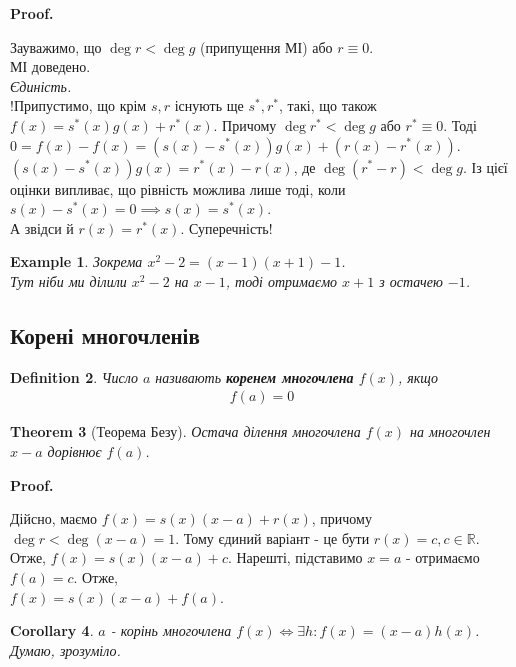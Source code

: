 \documentclass[a4paper, 10pt]{extarticle}
\makeatletter
\def\qed{$\blacksquare$}
\def\qed{$\blacksquare$}
\theoremstyle{theoremdd}
\newtheorem{theorem}{Theorem}[subsection]
\theoremstyle{theoremdd}
\newtheorem{definition}[theorem]{Definition}
\theoremstyle{theoremdd}
\theoremstyle{theoremdd}
\newtheorem{example}[theorem]{Example}
\theoremstyle{theoremdd}
\theoremstyle{theoremdd}
\theoremstyle{theoremdd}
\theoremstyle{theoremdd}
\newtheorem{corollary}[theorem]{Corollary}
\renewenvironment{proof}[1][Proof.\\]{\par
\pushQED{\hfill \qed}%
\normalfont \topsep6\p@\@plus6\p@\relax
\trivlist
\item\relax
{\bfseries
#1\@addpunct{.}}\hspace\labelsep\ignorespaces
}{%
\popQED\endtrivlist\@endpefalse
}
\makeatother
\begin{document}
\begin{proof}
Зауважимо, що $\deg r < \deg g$ (припущення МІ) або $r \equiv 0$.\\
МІ доведено.
\bigskip \\
\textit{Єдиність.}\\
!Припустимо, що крім $s,r$ існують ще $s^*,r^*$, такі, що також $f(x) = s^*(x)g(x) + r^*(x)$. Причому $\deg r^* < \deg g$ або $r^* \equiv 0$. Тоді \\ $0 = f(x) - f(x) = (s(x)-s^*(x))g(x) + (r(x)-r^*(x))$.\\
$(s(x)-s^*(x))g(x) = r^*(x)-r(x)$, де $\deg(r^*-r) < \deg g$. Із цієї оцінки випливає, що рівність можлива лише тоді, коли $s(x)-s^*(x) =0 \implies s(x) = s^*(x)$.\\
А звідси й $r(x) = r^*(x)$. Суперечність!
\end{proof}

\begin{example}
Зокрема $x^2-2 = (x-1)(x+1) -1$.\\
Тут ніби ми ділили $x^2-2$ на $x-1$, тоді отримаємо $x+1$ з остачею $-1$.
\end{example}

\subsection{Корені многочленів}
\begin{definition}
Число $a$ називають \textbf{коренем многочлена} $f(x)$, якщо
\begin{align*}
f(a) = 0
\end{align*}
\end{definition}

\begin{theorem}[Теорема Безу]
Остача ділення многочлена $f(x)$ на многочлен $x-a$ дорівнює $f(a)$.
\end{theorem}

\begin{proof}
Дійсно, маємо $f(x) = s(x)(x-a) + r(x)$, причому $\deg r < \deg (x-a) = 1$. Тому єдиний варіант - це бути $r(x) = c, c \in \mathbb{R}$.\\
Отже, $f(x) = s(x)(x-a) + c$. Нарешті, підставимо $x = a$ - отримаємо $f(a) = c$. Отже,\\
$f(x) = s(x)(x-a) + f(a)$.
\end{proof}

\begin{corollary}
$a$ - корінь многочлена $f(x) \iff \exists h: f(x) = (x-a)h(x)$.\\
\textit{Думаю, зрозуміло.}
\end{corollary}
\end{document}
